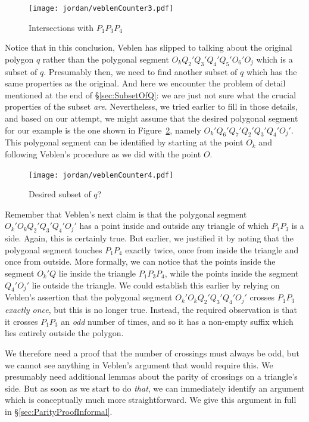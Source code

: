 \begin{figure}
\centering
\texttt{[image: jordan/veblenCounter3.pdf]}
\caption{Intersections with $P_1P_3P_4$}
\label{fig:VeblenCounter3}
\end{figure}

Notice that in this conclusion, Veblen has slipped to talking about the original polygon $q$ rather than the polygonal segment $O_kQ_2'Q_3'Q_4'Q_5'O_6'O_j$ which is a subset of $q$. Presumably then, we need to find another subset of $q$ which has the same properties as the original. And here we encounter the problem of detail mentioned at the end of \S\ref{sec:SubsetOfQ}: we are just not sure what the crucial properties of the subset \emph{are}. Nevertheless, we tried earlier to fill in those details, and based on our attempt, we might assume that the desired polygonal segment for our example is the one shown in Figure~\ref{fig:VeblenCounter4}, namely $O_k'Q_6'Q_7'Q_2'Q_3'Q_4'O_j'$. This polygonal segment can be identified by starting at the point $O_k$ and following Veblen's procedure as we did with the point $O$. 

\begin{figure}
\centering
\texttt{[image: jordan/veblenCounter4.pdf]}
\caption{Desired subset of $q$?}
\label{fig:VeblenCounter4}
\end{figure}

Remember that Veblen's next claim is that the polygonal segment $O_k'O_kQ_2'Q_3'Q_4'O_j'$ has a point inside and outside any triangle of which $P_1P_3$ is a side. Again, this is certainly true. But earlier, we justified it by noting that the polygonal segment touches $P_1P_4$ exactly twice, once from inside the triangle and once from outside. More formally, we can notice that the points inside the segment $O_k'Q$ lie inside the triangle $P_1P_3P_4$, while the points inside the segment $Q_4'O_j'$ lie outside the triangle. We could establish this earlier by relying on Veblen's assertion that the polygonal segment $O_k'O_kQ_2'Q_3'Q_4'O_j'$ crosses $P_1P_3$ \emph{exactly once}, but this is no longer true. Instead, the required observation is that it crosses $P_1P_3$ an \emph{odd} number of times, and so it has a non-empty suffix which lies entirely outside the polygon. 

We therefore need a proof that the number of crossings must always be odd, but we cannot see anything in Veblen's argument that would require this. We presumably need additional lemmas about the parity of crossings on a triangle's side. But as soon as we start to do \emph{that}, we can immediately identify an argument which is conceptually much more straightforward. We give this argument in full in \S\ref{sec:ParityProofInformal}.

